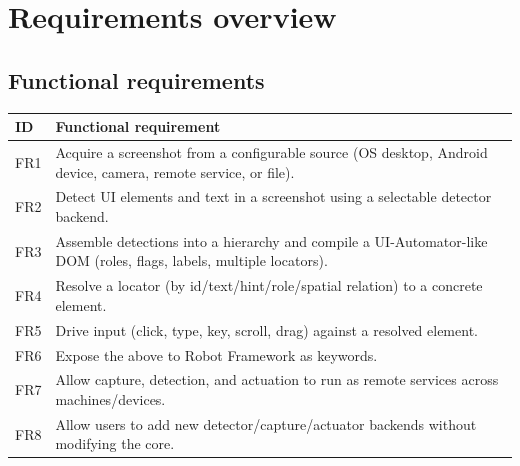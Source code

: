 \documentclass[11pt,a4paper]{report}
\begin{document}
\section{Requirements overview}
\subsection*{Functional requirements}
\begin{longtable}{@{}p{1.6cm}p{12.6cm}@{}}
\toprule
\textbf{ID} & \textbf{Functional requirement} \\
\midrule
\endhead
FR1 & Acquire a screenshot from a configurable source (OS desktop, Android device, camera, remote service, or file). \\
FR2 & Detect UI elements and text in a screenshot using a selectable detector backend. \\
FR3 & Assemble detections into a hierarchy and compile a UI-Automator-like DOM (roles, flags, labels, multiple locators). \\
FR4 & Resolve a locator (by id/text/hint/role/spatial relation) to a concrete element. \\
FR5 & Drive input (click, type, key, scroll, drag) against a resolved element. \\
FR6 & Expose the above to Robot Framework as keywords. \\
FR7 & Allow capture, detection, and actuation to run as remote services across machines/devices. \\
FR8 & Allow users to add new detector/capture/actuator backends without modifying the core. \\
\bottomrule
\end{longtable}
\end{document}
